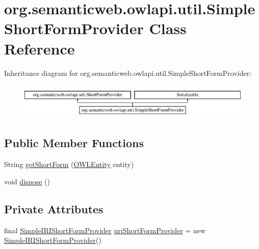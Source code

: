 \hypertarget{classorg_1_1semanticweb_1_1owlapi_1_1util_1_1_simple_short_form_provider}{\section{org.\-semanticweb.\-owlapi.\-util.\-Simple\-Short\-Form\-Provider Class Reference}
\label{classorg_1_1semanticweb_1_1owlapi_1_1util_1_1_simple_short_form_provider}
}
Inheritance diagram for org.\-semanticweb.\-owlapi.\-util.\-Simple\-Short\-Form\-Provider\-:\begin{figure}[H]
\begin{center}
\leavevmode
\includegraphics[height=1.728395cm]{classorg_1_1semanticweb_1_1owlapi_1_1util_1_1_simple_short_form_provider}
\end{center}
\end{figure}
\subsection*{Public Member Functions}
\begin{DoxyCompactItemize}
\item 
String \hyperlink{classorg_1_1semanticweb_1_1owlapi_1_1util_1_1_simple_short_form_provider_afc084cd50a0fc51f3069bee78f5e10ef}{get\-Short\-Form} (\hyperlink{interfaceorg_1_1semanticweb_1_1owlapi_1_1model_1_1_o_w_l_entity}{O\-W\-L\-Entity} entity)
\item 
void \hyperlink{classorg_1_1semanticweb_1_1owlapi_1_1util_1_1_simple_short_form_provider_a1afc299679f7a005fe8498514a791c38}{dispose} ()
\end{DoxyCompactItemize}
\subsection*{Private Attributes}
\begin{DoxyCompactItemize}
\item 
final \hyperlink{classorg_1_1semanticweb_1_1owlapi_1_1util_1_1_simple_i_r_i_short_form_provider}{Simple\-I\-R\-I\-Short\-Form\-Provider} \hyperlink{classorg_1_1semanticweb_1_1owlapi_1_1util_1_1_simple_short_form_provider_a54ac06dd611546fb5a53d6bab07267bd}{uri\-Short\-Form\-Provider} = new \hyperlink{classorg_1_1semanticweb_1_1owlapi_1_1util_1_1_simple_i_r_i_short_form_provider}{Simple\-I\-R\-I\-Short\-Form\-Provider}()
\end{DoxyCompactItemize}
